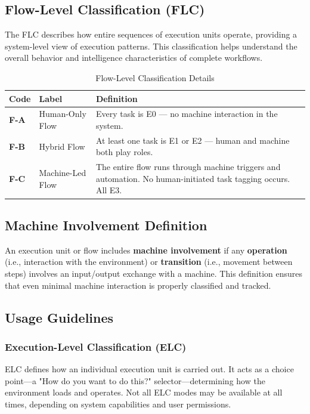 \documentclass[12pt,a4paper]{article}
\newcommand{\flc}[1]{\textbf{F-#1}}
\begin{document}
\subsection{Flow-Level Classification (FLC)}

The FLC describes how entire sequences of execution units operate, providing a system-level view of execution patterns. This classification helps understand the overall behavior and intelligence characteristics of complete workflows.

\begin{table}[h]
\centering
\caption{Flow-Level Classification Details}
\begin{tabular}{|l|l|l|}
\hline
\textbf{Code} & \textbf{Label} & \textbf{Definition} \\
\hline
\flc{A} & Human-Only Flow & Every task is E0 — no machine interaction in the system. \\
\hline
\flc{B} & Hybrid Flow & At least one task is E1 or E2 — human and machine both play roles. \\
\hline
\flc{C} & Machine-Led Flow & The entire flow runs through machine triggers and automation. No human-initiated task tagging occurs. All E3. \\
\hline
\end{tabular}
\end{table}

\subsection{Machine Involvement Definition}

An execution unit or flow includes \textbf{machine involvement} if any \textbf{operation} (i.e., interaction with the environment) or \textbf{transition} (i.e., movement between steps) involves an input/output exchange with a machine. This definition ensures that even minimal machine interaction is properly classified and tracked.

\subsection{Usage Guidelines}

\subsubsection{Execution-Level Classification (ELC)}

ELC defines how an individual execution unit is carried out. It acts as a choice point—a "How do you want to do this?" selector—determining how the environment loads and operates. Not all ELC modes may be available at all times, depending on system capabilities and user permissions.
\end{document}
